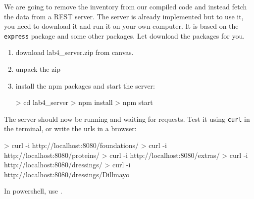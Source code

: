 \documentclass[fleqn, article, a4paper]{memoir}
\begin{document}
\begin{Assignments}

\item We are going to remove the inventory from our compiled code and instead fetch the data from a REST server. The server is already implemented but to use it, you need to download it and run it on your own computer. It is based on the \texttt{express} package and some other packages. Let  download the packages for you.
\begin{enumerate}
  \item download lab4\_server.zip from canvas.
  \item unpack the zip
  \item install the npm packages and start the server:
\begin{Code}
> cd lab4_server
> npm install
> npm start
\end{Code}
\end{enumerate}
The server should now be running and waiting for requests. Test it using \texttt{curl} in the terminal, or write the urls in a browser:
\begin{Code}
> curl -i http://localhost:8080/foundations/
> curl -i http://localhost:8080/proteins/
> curl -i http://localhost:8080/extras/
> curl -i http://localhost:8080/dressings/
> curl -i http://localhost:8080/dressings/Dillmayo
\end{Code}

In powershell, use .



\end{Assignments}
\end{document}
